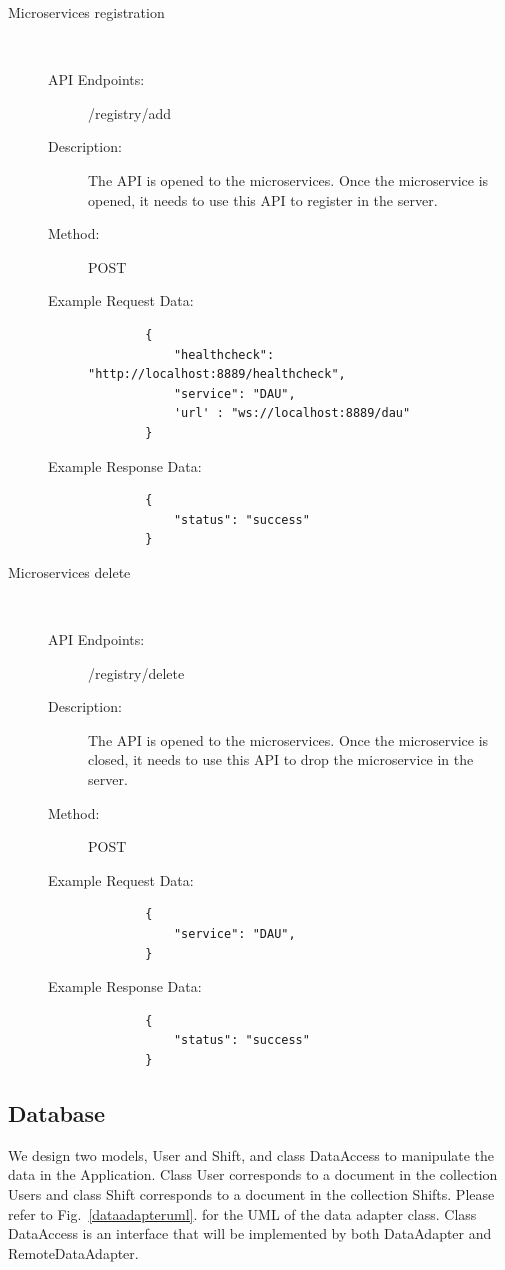 \documentclass[11pt, oneside]{article}   	%
\begin{document}
\begin{description}
    \item[Microservices registration]
    \
    \begin{description}
        \item[API Endpoints: ] /registry/add
        \item[Description: ] The API is opened to the microservices. Once the microservice is opened, it needs to use this API to register in the server.
        \item[Method: ] POST
        \item[Example Request Data: ]
        \begin{verbatim}
        {
            "healthcheck": "http://localhost:8889/healthcheck",
            "service": "DAU", 
            'url' : "ws://localhost:8889/dau"
        }
        \end{verbatim}
        \item[Example Response Data: ]
        \begin{verbatim}
        {
            "status": "success"
        }
        \end{verbatim}
    \end{description}

    \item[Microservices delete]
    \
    \begin{description}
        \item[API Endpoints: ] /registry/delete
        \item[Description: ] The API is opened to the microservices. Once the microservice is closed, it needs to use this API to drop the microservice in the server.
        \item[Method: ] POST
        \item[Example Request Data: ]
        \begin{verbatim}
        {
            "service": "DAU", 
        }
        \end{verbatim}
        \item[Example Response Data: ]
        \begin{verbatim}
        {
            "status": "success"
        }
        \end{verbatim}
    \end{description}




\end{description}

\subsection{Database}
We design two models, User and Shift, and class DataAccess to manipulate the data in the Application.
Class User corresponds to a document in the collection Users and class Shift corresponds to a document in the collection Shifts.
Please refer to Fig.~\ref{dataadapteruml}. for the UML of the data adapter class.
Class DataAccess is an interface that will be implemented by both DataAdapter and RemoteDataAdapter.
\end{document}
